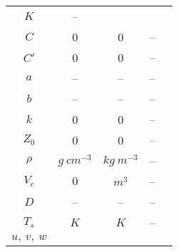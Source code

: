 \documentclass[a4paper,11pt]{article}
\begin{document}
\begin{longtable}{|c|c|c|c|c|}
\begin{math} K\end{math} &
-- & \\
\cline{1-4}
\begin{math} C \end{math} &
0 &
0 &
-- & \\
\cline{1-4}
\begin{math} C' \end{math} &
0 &
0 &
-- & \\
\cline{1-4}
\begin{math} a \end{math} &
-- &
-- &
-- & \\
\cline{1-4}
\begin{math} b \end{math} &
-- &
-- &
-- & \\
\cline{1-4}
\begin{math} k \end{math} &
0 &
0 &
-- & \\
\cline{1-4}
\begin{math} Z_0 \end{math} &
0 &
0 &
-- & \\
\hline
\begin{math}\rho\end{math} &
\begin{math} g \: cm^{-3}\end{math} &
\begin{math} kg \: m^{-3}\end{math} &
-- & \\
\cline{1-4}
\begin{math}V_c\end{math} &
\begin{math} 0\end{math} &
\begin{math} m^3\end{math} &
-- & \\
\cline{1-4}
\begin{math}D\end{math} &
-- &
-- &
-- & \\
\cline{1-4}
\begin{math}T_s\end{math} &
\begin{math} K\end{math} &
\begin{math} K\end{math} &
-- & \\
\cline{1-4}
\begin{math}u, \: v, \: w\end{math} &

\end{longtable}
\end{document}
